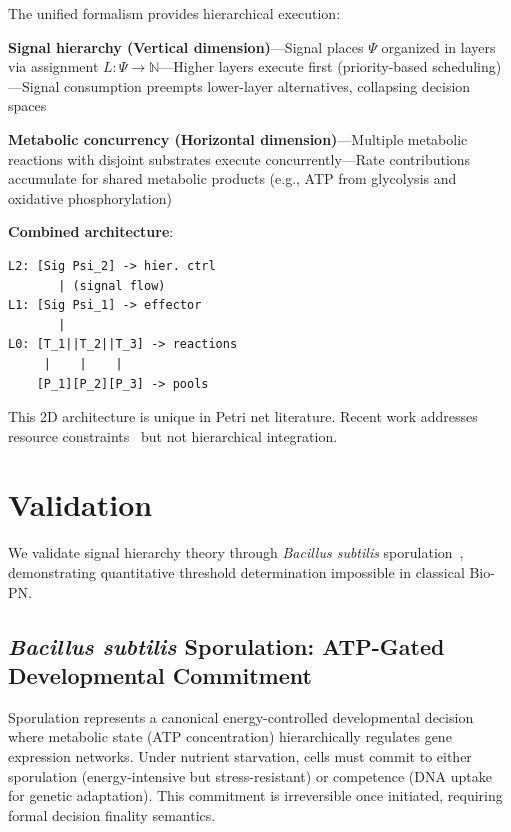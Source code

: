 \documentclass[twocolumn,11pt]{article}
\begin{document}
\vspace{3pt}
\noindent The unified formalism provides hierarchical execution:

\vspace{3pt}
\noindent\textbf{Signal hierarchy (Vertical dimension)}---Signal places $\Psi$ organized in layers via assignment $L: \Psi \to \mathbb{N}$---Higher layers execute first (priority-based scheduling)---Signal consumption preempts lower-layer alternatives, collapsing decision spaces

\vspace{3pt}
\noindent\textbf{Metabolic concurrency (Horizontal dimension)}---Multiple metabolic reactions with disjoint substrates execute concurrently---Rate contributions accumulate for shared metabolic products (e.g., ATP from glycolysis and oxidative phosphorylation)

\vspace{3pt}
\noindent\textbf{Combined architecture}:
\begin{center}
\begin{verbatim}
L2: [Sig Psi_2] -> hier. ctrl
       | (signal flow)
L1: [Sig Psi_1] -> effector
       |
L0: [T_1||T_2||T_3] -> reactions
     |    |    |
    [P_1][P_2][P_3] -> pools
\end{verbatim}
\end{center}

\vspace{3pt}
\noindent This 2D architecture is unique in Petri net literature. Recent work addresses resource constraints~\cite{genovese2021} but not hierarchical integration.

\section{Validation}

We validate signal hierarchy theory through \textit{Bacillus subtilis} sporulation~\cite{subtilis2026}, demonstrating quantitative threshold determination impossible in classical Bio-PN.

\subsection{\textit{Bacillus subtilis} Sporulation: ATP-Gated Developmental Commitment}

\vspace{3pt}
\noindent Sporulation represents a canonical energy-controlled developmental decision where metabolic state (ATP concentration) hierarchically regulates gene expression networks. Under nutrient starvation, cells must commit to either sporulation (energy-intensive but stress-resistant) or competence (DNA uptake for genetic adaptation). This commitment is irreversible once initiated, requiring formal decision finality semantics.
\end{document}
